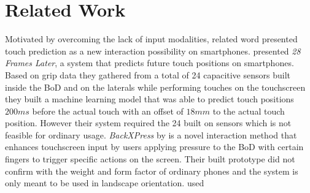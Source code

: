 \section{Related Work}
\label{sec:relw}
Motivated by overcoming the lack of input modalities, related word presented touch prediction as a new interaction possibility on smartphones.
\citeauthor{MohdNoor2016} \cite{MohdNoor2016} presented \textit{28 Frames Later}, a system that predicts future touch positions on smartphones. 
Based on grip data they gathered from a total of 24 capacitive sensors built inside the BoD and on the laterals while performing touches on the touchscreen they built a machine learning model that was able to predict touch positions $ 200ms $ before the actual touch with an offset of $ 18mm $ to the actual touch position.
However their system required the 24 built on sensors which is not feasible for ordinary usage.
\textit{BackXPress} by \citeauthor{Corsten2017} \cite{Corsten2017} is a novel interaction method that enhances touchscreen input by users applying pressure to the BoD with certain fingers to trigger specific actions on the screen.
Their built prototype did not confirm with the weight and form factor of ordinary phones and the system is only meant to be used in landscape orientation.
\citeauthor{Lochtefeld2015} \cite{Lochtefeld2015} used 


